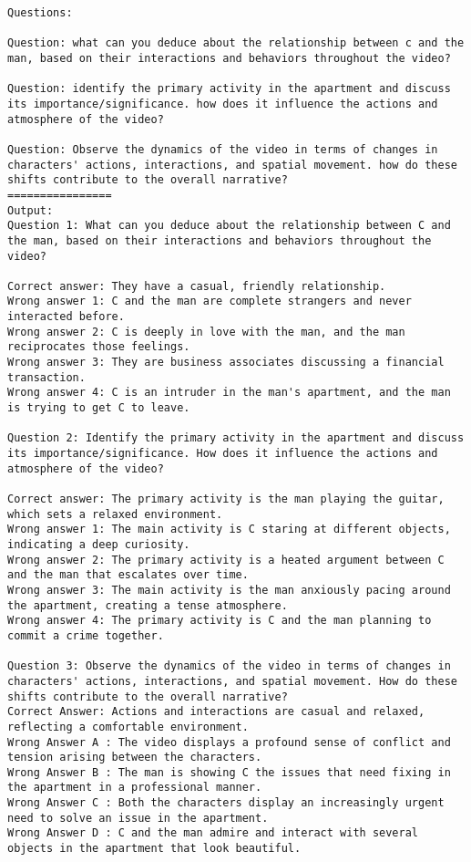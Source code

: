 \begin{lstlisting}
Questions:

Question: what can you deduce about the relationship between c and the man, based on their interactions and behaviors throughout the video?

Question: identify the primary activity in the apartment and discuss its importance/significance. how does it influence the actions and atmosphere of the video?

Question: Observe the dynamics of the video in terms of changes in characters' actions, interactions, and spatial movement. how do these shifts contribute to the overall narrative?
================
Output:
Question 1: What can you deduce about the relationship between C and the man, based on their interactions and behaviors throughout the video?

Correct answer: They have a casual, friendly relationship.
Wrong answer 1: C and the man are complete strangers and never interacted before.
Wrong answer 2: C is deeply in love with the man, and the man reciprocates those feelings.
Wrong answer 3: They are business associates discussing a financial transaction.
Wrong answer 4: C is an intruder in the man's apartment, and the man is trying to get C to leave.

Question 2: Identify the primary activity in the apartment and discuss its importance/significance. How does it influence the actions and atmosphere of the video?

Correct answer: The primary activity is the man playing the guitar, which sets a relaxed environment.
Wrong answer 1: The main activity is C staring at different objects, indicating a deep curiosity.
Wrong answer 2: The primary activity is a heated argument between C and the man that escalates over time.
Wrong answer 3: The main activity is the man anxiously pacing around the apartment, creating a tense atmosphere.
Wrong answer 4: The primary activity is C and the man planning to commit a crime together.

Question 3: Observe the dynamics of the video in terms of changes in characters' actions, interactions, and spatial movement. How do these shifts contribute to the overall narrative?
Correct Answer: Actions and interactions are casual and relaxed, reflecting a comfortable environment.
Wrong Answer A : The video displays a profound sense of conflict and tension arising between the characters.
Wrong Answer B : The man is showing C the issues that need fixing in the apartment in a professional manner.
Wrong Answer C : Both the characters display an increasingly urgent need to solve an issue in the apartment.
Wrong Answer D : C and the man admire and interact with several objects in the apartment that look beautiful.
\end{lstlisting}
